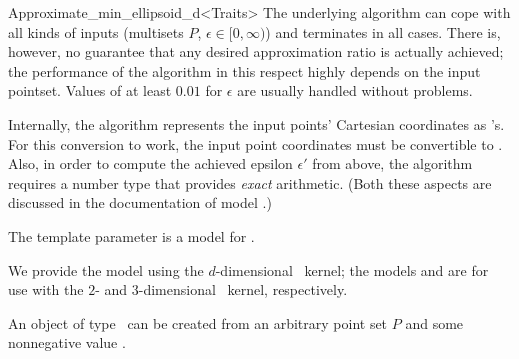 \begin{ccRefClass}{Approximate_min_ellipsoid_d<Traits>}
The underlying algorithm can cope with all kinds of inputs (multisets
$P$, $\epsilon\in[0,\infty)$) and terminates in all cases.  There
is, however, no guarantee that any desired approximation ratio
is actually achieved; the performance of the algorithm in this respect
highly depends on the input pointset.  Values of at least $0.01$ for
$\epsilon$ are usually handled without problems.

Internally, the algorithm represents the input points' Cartesian
coordinates as 's.  For this conversion to work, the input
point coordinates must be convertible to .  Also, in order
to compute the achieved epsilon $\epsilon'$ from above, the algorithm
requires a number type  that provides \emph{exact} arithmetic.
(Both these aspects are discussed in the documentation of model
.)


\ccRequirements
\ccIndexRequirements

The template parameter  is a model for
.

We provide the model
 using the
$d$-dimensional \cgal~kernel; the models
 and
 are for use with
the $2$- and $3$-dimensional \cgal~kernel, respectively.

\ccTypes
\ccIndexClassTypes

\ccSetTwoColumns{\ccRefName}{}

  

\ccPropagateThreeToTwoColumns

\ccCreation
\ccIndexClassCreation
{}

An object of type \ccRefName\ can be created from an arbitrary point
set $P$ and some nonnegative  value .


\end{ccRefClass}
